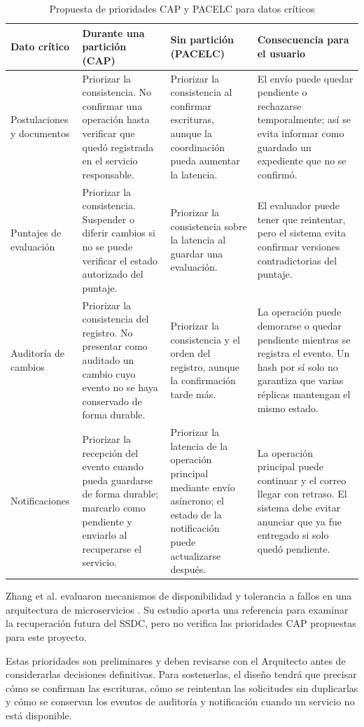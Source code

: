 \begin{table}[H]
\centering
\small
\caption{Propuesta de prioridades CAP y PACELC para datos críticos}
\begin{tabularx}{\linewidth}{@{}p{2.7cm}XXp{3.2cm}@{}}
\toprule
\textbf{Dato crítico} &
\textbf{Durante una partición (CAP)} &
\textbf{Sin partición (PACELC)} &
\textbf{Consecuencia para el usuario} \\
\midrule
Postulaciones y documentos &
Priorizar la consistencia. No confirmar una operación hasta verificar que quedó registrada en el servicio responsable. &
Priorizar la consistencia al confirmar escrituras, aunque la coordinación pueda aumentar la latencia. &
El envío puede quedar pendiente o rechazarse temporalmente; así se evita informar como guardado un expediente que no se confirmó. \\

Puntajes de evaluación &
Priorizar la consistencia. Suspender o diferir cambios si no se puede verificar el estado autorizado del puntaje. &
Priorizar la consistencia sobre la latencia al guardar una evaluación. &
El evaluador puede tener que reintentar, pero el sistema evita confirmar versiones contradictorias del puntaje. \\

Auditoría de cambios &
Priorizar la consistencia del registro. No presentar como auditado un cambio cuyo evento no se haya conservado de forma durable. &
Priorizar la consistencia y el orden del registro, aunque la confirmación tarde más. &
La operación puede demorarse o quedar pendiente mientras se registra el evento. Un hash por sí solo no garantiza que varias réplicas mantengan el mismo estado. \\

Notificaciones &
Priorizar la recepción del evento cuando pueda guardarse de forma durable; marcarlo como pendiente y enviarlo al recuperarse el servicio. &
Priorizar la latencia de la operación principal mediante envío asíncrono; el estado de la notificación puede actualizarse después. &
La operación principal puede continuar y el correo llegar con retraso. El sistema debe evitar anunciar que ya fue entregado si solo quedó pendiente. \\
\bottomrule
\end{tabularx}
\end{table}

Zhang et al. evaluaron mecanismos de disponibilidad y tolerancia a fallos en una arquitectura de microservicios \cite{zhang2025microservices}. Su estudio aporta una referencia para examinar la recuperación futura del SSDC, pero no verifica las prioridades CAP propuestas para este proyecto.

Estas prioridades son preliminares y deben revisarse con el Arquitecto antes de considerarlas decisiones definitivas. Para sostenerlas, el diseño tendrá que precisar cómo se confirman las escrituras, cómo se reintentan las solicitudes sin duplicarlas y cómo se conservan los eventos de auditoría y notificación cuando un servicio no está disponible.